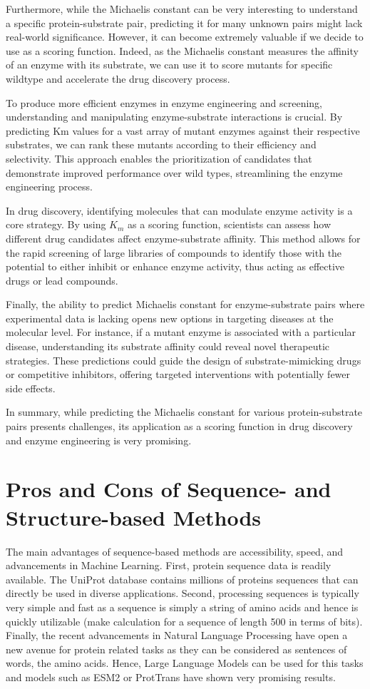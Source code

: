 Furthermore, while the Michaelis constant can be very interesting to understand a specific protein-substrate pair, predicting it for many unknown pairs might lack real-world significance. However, it can become extremely valuable if we decide to use as a scoring function. Indeed, as the Michaelis constant measures the affinity of an enzyme with its substrate, we can use it to score mutants for specific wildtype and accelerate the drug discovery process. 

To produce more efficient enzymes in enzyme engineering and screening, understanding and manipulating enzyme-substrate interactions is crucial. By predicting Km values for a vast array of mutant enzymes against their respective substrates, we can rank these mutants according to their efficiency and selectivity. This approach enables the prioritization of candidates that demonstrate improved performance over wild types, streamlining the enzyme engineering process.

In drug discovery, identifying molecules that can modulate enzyme activity is a core strategy. By using $K_m$ as a scoring function, scientists can assess how different drug candidates affect enzyme-substrate affinity. This method allows for the rapid screening of large libraries of compounds to identify those with the potential to either inhibit or enhance enzyme activity, thus acting as effective drugs or lead compounds.

Finally, the ability to predict Michaelis constant for enzyme-substrate pairs where experimental data is lacking opens new options in targeting diseases at the molecular level. For instance, if a mutant enzyme is associated with a particular disease, understanding its substrate affinity could reveal novel therapeutic strategies. These predictions could guide the design of substrate-mimicking drugs or competitive inhibitors, offering targeted interventions with potentially fewer side effects.

In summary, while predicting the Michaelis constant for various protein-substrate pairs presents challenges, its application as a scoring function in drug discovery and enzyme engineering is very promising.

\section{Pros and Cons of Sequence- and Structure-based Methods}

The main advantages of sequence-based methods are accessibility, speed, and advancements in Machine Learning. First, protein sequence data is readily available. The UniProt database contains millions of proteins sequences that can directly be used in diverse applications. Second, processing sequences is typically very simple and fast as a sequence is simply a string of amino acids and hence is quickly utilizable (make calculation for a sequence of length 500 in terms of bits). Finally, the recent advancements in Natural Language Processing have open a new avenue for protein related tasks as they can be considered as sentences of words, the amino acids. Hence, Large Language Models can be used for this tasks and models such as ESM2 or ProtTrans have shown very promising results. 

